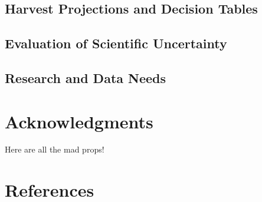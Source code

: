 \documentclass[11pt,
  english,
  a4paper,
]{article}
\begin{document}
\leavevmode\tagmcend\tagstructend


\hypertarget{harvest-projections-and-decision-tables}{%
\subsection{Harvest Projections and Decision Tables}\label{harvest-projections-and-decision-tables}}

\leavevmode\tagmcend\tagstructend


\hypertarget{evaluation-of-scientific-uncertainty}{%
\subsection{Evaluation of Scientific Uncertainty}\label{evaluation-of-scientific-uncertainty}}

\leavevmode\tagmcend\tagstructend


\hypertarget{research-and-data-needs-1}{%
\subsection{Research and Data Needs}\label{research-and-data-needs-1}}

\leavevmode\tagmcend\tagstructend


\hypertarget{acknowledgments}{%
\section{Acknowledgments}\label{acknowledgments}}

\leavevmode\tagmcend\tagstructend


Here are all the mad props!

\leavevmode\tagmcend\tagstructend\par

\clearpage


\hypertarget{references}{%
\section{References}\label{references}}
\end{document}
